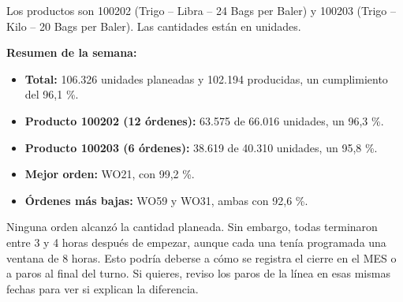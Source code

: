 \begin{singlespace}
{Los productos son 100202 (Trigo – Libra – 24 Bags per Baler) y 100203 (Trigo – Kilo – 20 Bags per Baler). Las cantidades están en unidades.



\textbf{Resumen de la semana:}

\begin{itemize}[leftmargin=1.2em,itemsep=0pt,topsep=2pt]
\item \textbf{Total:} 106.326 unidades planeadas y 102.194 producidas, un cumplimiento del 96,1 \%.
\item \textbf{Producto 100202 (12 órdenes):} 63.575 de 66.016 unidades, un 96,3 \%.
\item \textbf{Producto 100203 (6 órdenes):} 38.619 de 40.310 unidades, un 95,8 \%.
\item \textbf{Mejor orden:} WO21, con 99,2 \%.
\item \textbf{Órdenes más bajas:} WO59 y WO31, ambas con 92,6 \%.
\end{itemize}



Ninguna orden alcanzó la cantidad planeada. Sin embargo, todas terminaron entre 3 y 4 horas después de empezar, aunque cada una tenía programada una ventana de 8 horas. Esto podría deberse a cómo se registra el cierre en el MES o a paros al final del turno. Si quieres, reviso los paros de la línea en esas mismas fechas para ver si explican la diferencia.}

\end{singlespace}
